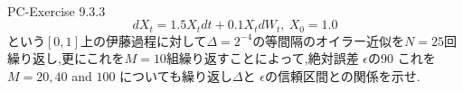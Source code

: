 \documentclass[dvipdfmx,cjk]{beamer}
\numberwithin{equation}{section}
\newlength{\cellleftmargin}
\newlength{\smallerfontscale}
\def\smaller{\fontsize{\smallerfontscale}{\smallerfontscale}\selectfont}
\begin{document}
\begin{frame}
    \begin{addmargin}[\cellleftmargin]{0em}%
    {\smaller%
    \vspace{-1\smallerfontscale}%
    
    \begin{center}
    \end{center}
    { \hspace*{\fill} \\}
    }%
    \end{addmargin}%
\end{frame}

\begin{frame}{PC-Exercise 9.3.3}
\[
dX_t = 1.5 X_t dt + 0.1 X_t dW_t ,\ X_0 =1.0
\]
という$[0,1]$上の伊藤過程に対して$\Delta= 2^{-4}$の等間隔のオイラー近似を$N=25$回繰り返し,更にこれを$M=10$組繰り返すことによって,絶対誤差 $\epsilon$の90%
これを$M = 20, 40$ and $100$ についても繰り返し$\Delta$と $\epsilon$の信頼区間との関係を示せ.
\end{frame}
\end{document}

